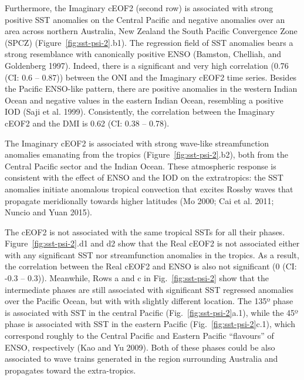 \documentclass[smallextended]{svjour3}       %
\begin{document}
Furthermore, the Imaginary cEOF2 (second row) is associated with strong positive SST anomalies on the Central Pacific and negative anomalies over an area across northern Australia, New Zealand the South Pacific Convergence Zone (SPCZ) (Figure~\ref{fig:sst-psi-2}.b1).
The regression field of SST anomalies bears a strong resemblance with canonically positive ENSO (Bamston, Chelliah, and Goldenberg 1997).
Indeed, there is a significant and very high correlation (0.76 (CI: 0.6 -- 0.87)) between the ONI and the Imaginary cEOF2 time series.
Besides the Pacific ENSO-like pattern, there are positive anomalies in the western Indian Ocean and negative values in the eastern Indian Ocean, resembling a positive IOD (Saji et al. 1999).
Consistently, the correlation between the Imaginary cEOF2 and the DMI is 0.62 (CI: 0.38 -- 0.78).

The Imaginary cEOF2 is associated with strong wave-like streamfunction anomalies emanating from the tropics (Figure~\ref{fig:sst-psi-2}.b2), both from the Central Pacific sector and the Indian Ocean.
These atmospheric response is consistent with the effect of ENSO and the IOD on the extratropics: the SST anomalies initiate anomalous tropical convection that excites Rossby waves that propagate meridionally towards higher latitudes (Mo 2000; Cai et al. 2011; Nuncio and Yuan 2015).

The cEOF2 is not associated with the same tropical SSTs for all their phases.
Figure~\ref{fig:sst-psi-2}.d1 and d2 show that the Real cEOF2 is not associated either with any significant SST nor streamfunction anomalies in the tropics.
As a result, the correlation between the Real cEOF2 and ENSO is also not significant (0 (CI: -0.3 -- 0.3)).
Meanwhile, Rows a and c in Fig.~\ref{fig:sst-psi-2} show that the intermediate phases are still associated with significant SST regressed anomalies over the Pacific Ocean, but with with slightly different location.
The 135º phase is associated with SST in the central Pacific (Fig.~\ref{fig:sst-psi-2}a.1), while the 45º phase is associated with SST in the eastern Pacific (Fig.~\ref{fig:sst-psi-2}c.1), which correspond roughly to the Central Pacific and Eastern Pacific ``flavours'' of ENSO, respectively (Kao and Yu 2009).
Both of these phases could be also associated to wave trains generated in the region surrounding Australia and propagates toward the extra-tropics.
\end{document}
